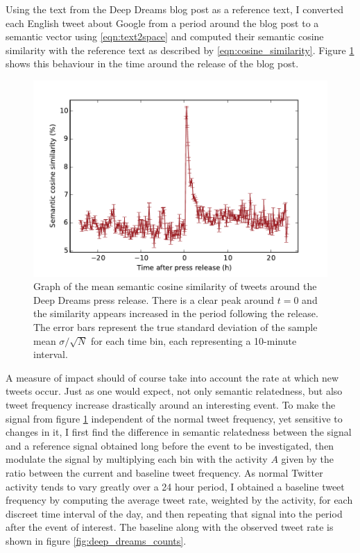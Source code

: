 Using the text from the Deep Dreams blog post as a reference text, I converted each English tweet about Google from a period around the blog post to a semantic vector using \eqref{eqn:text2space} and computed their semantic cosine similarity with the reference text as described by \eqref{eqn:cosine_similarity}. Figure \ref{fig:deep_dreams_initial} shows this behaviour in the time around the release of the blog post.
\begin{figure} %
	\centering
	\includegraphics[width=\figwidth]{pics/esa/deep_dreams_plot_timebin.pdf}
	\caption{Graph of the mean semantic cosine similarity of tweets around the Deep Dreams press release. There is a clear peak around $t=0$ and the similarity appears increased in the period following the release. The error bars represent the true standard deviation of the sample mean $\sigma/\sqrt{N}$ for each time bin, each representing a 10-minute interval.}
	\label{fig:deep_dreams_initial}
\end{figure}
A measure of impact should of course take into account the rate at which new tweets occur. Just as one would expect, not only semantic relatedness, but also tweet frequency increase drastically around an interesting event. To make the signal from figure \ref{fig:deep_dreams_initial} independent of the normal tweet frequency, yet sensitive to changes in it, I first find the difference in semantic relatedness between the signal and a reference signal obtained long before the event to be investigated, then modulate the signal by multiplying each bin with the activity $A$ given by the ratio between the current and baseline tweet frequency. As normal Twitter activity tends to vary greatly over a 24 hour period, I obtained a baseline tweet frequency by computing the average tweet rate, weighted by the activity, for each discreet time interval of the day, and then repeating that signal into the period after the event of interest. The baseline along with the observed tweet rate is shown in figure \ref{fig:deep_dreams_counts}.
